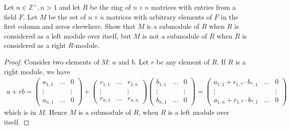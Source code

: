 \documentclass[10pt]{article}
\newcommand{\Z}{\mathbb{Z}}
\newenvironment{problem}[2][Problem]{\begin{trivlist}
		\item[\hskip \labelsep {\bfseries #1}\hskip \labelsep {\bfseries #2.}]}{\end{trivlist}}
\begin{document}
	\begin{problem}{1.21}
		Let $n \in \Z^+, n > 1$ and let $R$ be the ring of $n \times n$ matrices with entries from a field $F$. Let
		$M$ be the set of $n \times n$ matrices with arbitrary elements of $F$ in the first column and zeros
		elsewhere. Show that $M$ is a submodule of $R$ when $R$ is considered as a left module over
		itself, but $M$ is not a submodule of $R$ when $R$ is considered as a right $R$-module.
		\begin{proof}
			Consider two elements of $M$: $a$ and $b$. Let $r$ be any element of $R$. If $R$ is a right module, we have
			\begin{align*}
				a + rb = \begin{pmatrix}
					a_{1,1} & \dots & 0 \\
					\vdots &  & \vdots \\
					a_{n,1} & \dots & 0
				\end{pmatrix}
				+
				\begin{pmatrix}
					r_{1,1} & \dots & r_{1,n} \\
					\vdots &  & \vdots \\
					r_{n,1} & \dots & r_{n,n}
				\end{pmatrix}
				\begin{pmatrix}
					b_{1,1} & \dots & 0 \\
					\vdots &  & \vdots \\
					b_{n,1} & \dots & 0
				\end{pmatrix} = 
				\begin{pmatrix}
					a_{1,1} + r_{1,*} \cdot b_{*,1} & \dots & 0 \\
					\vdots &  & \vdots \\
					a_{1,n} + r_{1,*} \cdot b_{*,1} & \dots & 0
				\end{pmatrix}
			\end{align*}
			which is in $M$. Hence $M$ is a submodule of $R$, when $R$ is a left module over itself.
			

\end{proof}
\end{problem}
\end{document}
